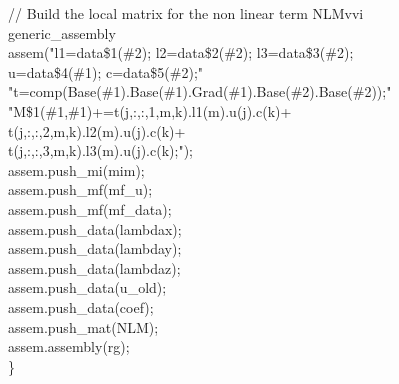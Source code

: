\documentclass[a4paper]{report}
\newcommand\tab[1][1cm]{\hspace*{#1}}
\begin{document}
{\tab	// Build the local matrix for the non linear term NLMvvi\\
\tab	generic\_\-assembly \\
\tab \tab	assem("l1=data\$1(\#2); l2=data\$2(\#2); l3=data\$3(\#2);\\\tab\tab\tab\tab u=data\$4(\#1); c=data\$5(\#2);"\\
\tab\tab \tab		  "t=comp(Base(\#1).Base(\#1).Grad(\#1).Base(\#2).Base(\#2));"\\
\tab\tab\tab		  "M\$1(\#1,\#1)+=t(j,:,:,1,m,k).l1(m).u(j).c(k)+\\ \tab\tab \tab\tab t(j,:,:,2,m,k).l2(m).u(j).c(k)+ \\ \tab\tab \tab\tab t(j,:,:,3,m,k).l3(m).u(j).c(k);");\\
\tab	assem.push\_\-mi(mim);\\
\tab	assem.push\_\-mf(mf\_\-u);\\
\tab	assem.push\_\-mf(mf\_\-data);\\
\tab	assem.push\_\-data(lambdax);\\
\tab	assem.push\_\-data(lambday);\\
\tab	assem.push\_\-data(lambdaz);\\
\tab	assem.push\_\-data(u\_\-old);\\
\tab	assem.push\_\-data(coef);\\
\tab	assem.push\_\-mat(NLM);\\
\tab	assem.assembly(rg);\\
\}

}
\end{document}
